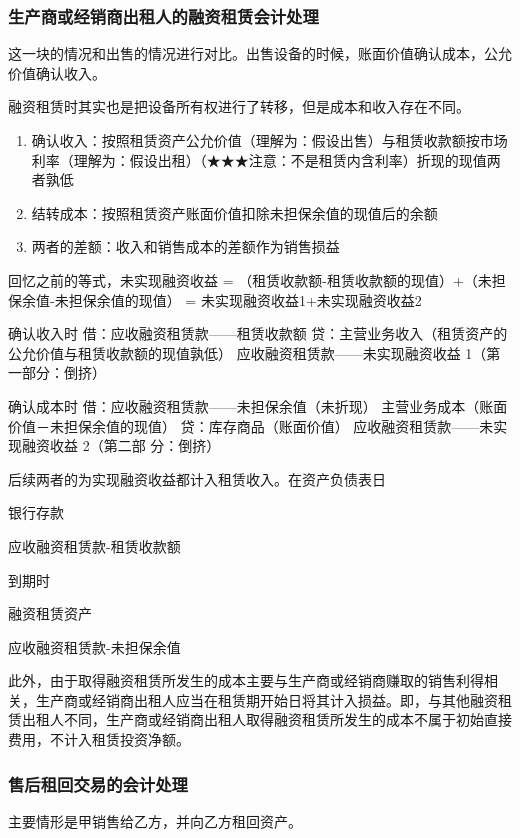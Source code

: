 \documentclass[UTF8,12pt]{ctexart}
\newenvironment{Dr}{%
	\begin{list}{}%
		{
			\setlength{\leftmargin}{2em}
			\setlength{\labelwidth}{2em}
			\setlength{\labelsep}{0pt}
			\setlength{\itemindent}{0pt}
			\setlength{\listparindent}{0pt}
			\setlength{\parsep}{0pt}
			\setlength{\topsep}{0pt}
		}
		\item[\textbf{借：}]
	}{%
	\end{list}
}
\newenvironment{Cr}{%
	\begin{list}{}%
		{
			\setlength{\leftmargin}{3em}
			\setlength{\labelwidth}{2em}
			\setlength{\labelsep}{0pt}
			\setlength{\itemindent}{0pt}
			\setlength{\listparindent}{0pt}
			\setlength{\parsep}{0pt}
			\setlength{\topsep}{0pt}
		}
		\item[\textbf{贷：}]
	}{%
	\end{list}
}
\numberwithin{equation}{section} %
\numberwithin{figure}{section}
\numberwithin{table}{section}
\begin{document}
	\subsubsection{生产商或经销商出租人的融资租赁会计处理}
	这一块的情况和出售的情况进行对比。出售设备的时候，账面价值确认成本，公允价值确认收入。
	
	融资租赁时其实也是把设备所有权进行了转移，但是成本和收入存在不同。
	\begin{enumerate}
		\item 确认收入：按照租赁资产公允价值（理解为：假设出售）与租赁收款额按市场利率（理解为：假设出租）（★★★注意：不是租赁内含利率）折现的现值两者孰低
		
		\item 结转成本：按照租赁资产账面价值扣除未担保余值的现值后的余额
		
		\item 两者的差额：收入和销售成本的差额作为销售损益
	\end{enumerate}
	
	回忆之前的等式，未实现融资收益 = （租赁收款额-租赁收款额的现值）+（未担保余值-未担保余值的现值） = 未实现融资收益1+未实现融资收益2
	
	确认收入时
	借：应收融资租赁款——租赁收款额
	贷：主营业务收入（租赁资产的公允价值与租赁收款额的现值孰低）
	应收融资租赁款——未实现融资收益
	1（第一部分：倒挤）
	
	确认成本时
	借：应收融资租赁款——未担保余值（未折现）
	主营业务成本（账面价值－未担保余值的现值） 贷：库存商品（账面价值）
	应收融资租赁款——未实现融资收益 2（第二部
	分：倒挤）
	
	后续两者的为实现融资收益都计入租赁收入。在资产负债表日
	\begin{Dr}
		银行存款
	\end{Dr}
	\begin{Cr}
		应收融资租赁款-租赁收款额
	\end{Cr}

	到期时
	\begin{Dr}
		融资租赁资产
	\end{Dr}
	\begin{Cr}
		应收融资租赁款-未担保余值
	\end{Cr}
	
	此外，由于取得融资租赁所发生的成本主要与生产商或经销商赚取的销售利得相关，生产商或经销商出租人应当在租赁期开始日将其计入损益。即，与其他融资租赁出租人不同，生产商或经销商出租人取得融资租赁所发生的成本不属于初始直接费用，不计入租赁投资净额。
	
	\subsubsection{售后租回交易的会计处理}
	主要情形是甲销售给乙方，并向乙方租回资产。
	
\end{document}

